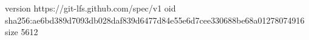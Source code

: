 version https://git-lfs.github.com/spec/v1
oid sha256:ae6bd389d7093db028daf839d6477d84e55e6d7cee330688be68a01278074916
size 5612
